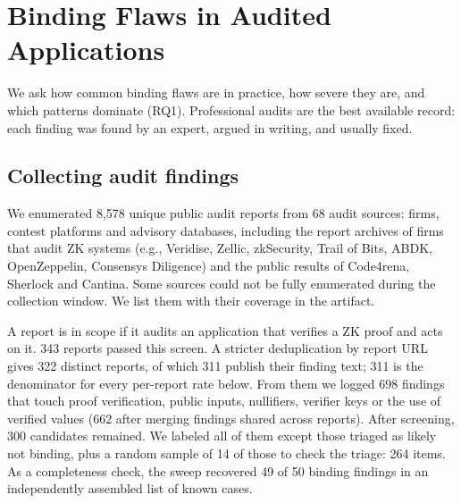 \section{Binding Flaws in Audited Applications}\label{sec:study}

We ask how common binding flaws are in practice, how severe they are, and
which patterns dominate (RQ1). Professional audits are the best available
record: each finding was found by an expert, argued in writing, and usually
fixed.

\subsection{Collecting audit findings}\label{sec:study-collect}

We enumerated 8,578 unique public audit reports from 68 audit sources: firms, contest
platforms and advisory databases, including the report archives of firms
that audit ZK systems (e.g., Veridise, Zellic, zkSecurity, Trail of Bits,
ABDK, OpenZeppelin, Consensys Diligence) and the public results of
Code4rena, Sherlock and Cantina.
Some sources could not be fully enumerated during the collection window. We
list them with their coverage in the artifact.

A report is in scope if it audits an application that verifies a ZK proof and
acts on it. 343 reports passed this screen. A stricter deduplication by
report URL gives 322 distinct reports, of which 311 publish their finding
text; 311 is the denominator for every per-report rate below.
 From them we logged 698 findings
that touch proof verification, public inputs, nullifiers, verifier keys or the
use of verified values (662 after merging findings shared across reports).
After screening, 300 candidates remained. We labeled all of them except
those triaged as likely not binding, plus a random sample of 14 of those to
check the triage: 264 items.
As a completeness check, the sweep recovered 49 of 50 binding findings in an
independently assembled list of known cases.

